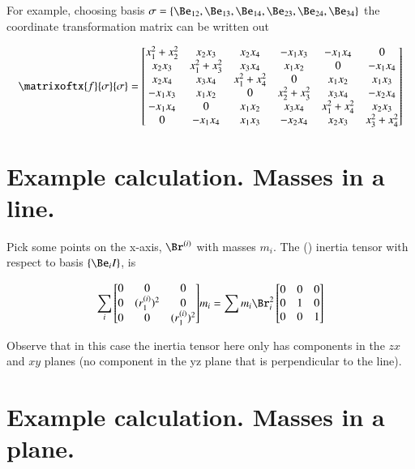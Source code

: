 For example, choosing basis $\sigma = \{ \Be_{12}, \Be_{13}, \Be_{14}, \Be_{23}, \Be_{24}, \Be_{34} \}$ the coordinate transformation matrix can be written out

\[
\matrixoftx{f}{\sigma}{\sigma}
=
\begin{bmatrix}
x_1^2 + x_2^2     &     x_2 x_3      &     x_2 x_4    &     -x_1 x_3      &    -x_1 x_4    &     0 \\
x_2 x_3           & x_1^2 + x_3^2    &     x_3 x_4      &     x_1 x_2    &            0  & -x_1 x_4 \\
x_2 x_4           &  x_3 x_4         & x_1^2 + x_4^2    &         0    &      x_1 x_2    & x_1 x_3 \\
-x_1 x_3          &  x_1 x_2         &          0     & x_2^2 + x_3^2  &      x_3 x_4    & -x_2 x_4 \\
-x_1 x_4          &  0             &     x_1 x_2      &     x_3 x_4    & x_1^2 + x_4^2   & x_2 x_3 \\
   0            &  -x_1 x_4        &     x_1 x_3      &    -x_2 x_4    &      x_2 x_3    &  x_3^2 + x_4^2 \\
\end{bmatrix}
\]

\section{Example calculation.  Masses in a line. }

Pick some points on the x-axis, $\Br^{(i)}$ with masses $m_i$.
The () inertia tensor with respect to basis $\{\Be_i I\}$, is

\[
\sum_i {
\begin{bmatrix}
 0 & 0               & 0      \\
 0 & (r^{(i)}_1)^2     & 0      \\
 0 & 0               & (r^{(i)}_1)^2  \\
\end{bmatrix}
} m_i
= \sum{ m_i \Br_i^2}
\begin{bmatrix}
0 & 0 & 0 \\
0 & 1 & 0 \\
0 & 0 & 1 \\
\end{bmatrix}
\]

Observe that in this case the inertia tensor here only has components in the $zx$ and $xy$ planes (no component in the yz plane that is perpendicular to the line).

\section{Example calculation.  Masses in a plane. }


